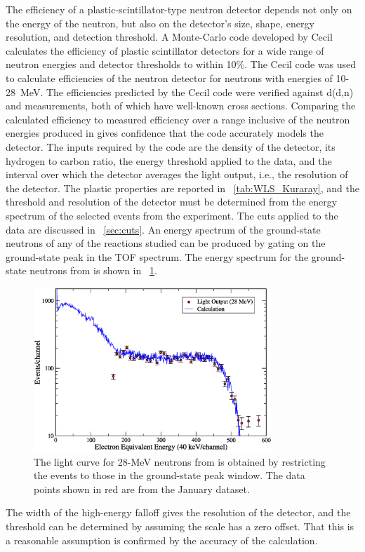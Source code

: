 The efficiency of a plastic-scintillator-type neutron detector depends not only on the energy of the neutron, but also on the detector's size, shape, energy resolution, and detection threshold.  A Monte-Carlo code developed by Cecil \citep{Cecil_neutEfficiency} calculates the efficiency of plastic scintillator detectors for a wide range of neutron energies and detector thresholds to within 10\%.  The Cecil code was used to calculate efficiencies of the neutron detector for neutrons with energies of 10-28~MeV.  The efficiencies predicted by the Cecil code were verified against d(d,n) and \MgReaction measurements, both of which have well-known cross sections.  Comparing the calculated efficiency to measured efficiency over a range inclusive of the neutron energies produced in \reaction gives confidence that the code accurately models the detector.   The inputs required by the code are the density of the detector, its hydrogen to carbon ratio, the energy threshold applied to the data, and the interval over which the detector averages the light output, i.e., the resolution of the detector.  The plastic properties are reported in {\tab}~\ref{tab:WLS_Kuraray}, and the threshold and resolution of the detector must be determined from the energy spectrum of the selected events from the experiment.  The cuts applied to the data are discussed in {\sect}~\ref{sec:cuts}.  An energy spectrum of the ground-state neutrons of any of the reactions studied can be produced by gating on the ground-state peak in the TOF spectrum.  The energy spectrum for the ground-state neutrons from \MgReaction is shown in {\fig}~\ref{fig:lowEnergyCut}. 
\begin{figure}[!htbp]
\centering
\includegraphics[width=0.8\textwidth]{figures/Lite_28MeV.eps}
\caption[Total light deposited 28-MeV neutrons.]{The light curve for 28-MeV neutrons from \MgReaction is obtained by restricting the events to those in the ground-state peak window.  The data points shown in red are from the January dataset.}
\label{fig:lowEnergyCut}
\end{figure}
The width of the high-energy falloff gives the resolution of the detector, and the threshold can be determined by assuming the scale has a zero offset.  That this is a reasonable assumption is confirmed by the accuracy of the calculation.  

